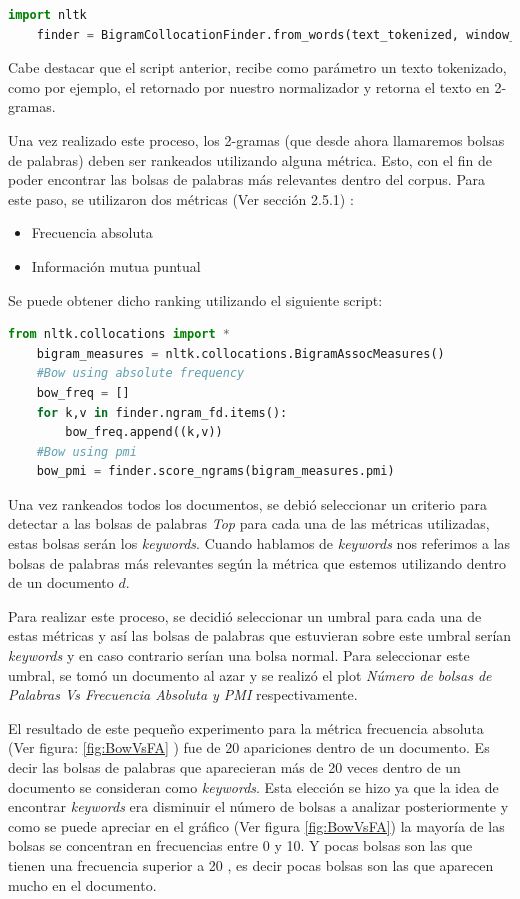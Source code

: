     \begin{lstlisting}[language=Python]
    import nltk
    finder = BigramCollocationFinder.from_words(text_tokenized, window_size = 3)
    \end{lstlisting}
    
    Cabe destacar que el script anterior, recibe como parámetro un texto tokenizado, como por ejemplo, el retornado por nuestro normalizador y retorna el texto en 2-gramas.
    
    Una vez realizado este proceso, los 2-gramas (que desde ahora llamaremos bolsas de palabras) deben ser rankeados utilizando alguna métrica. Esto, con el fin de poder encontrar las bolsas de palabras más relevantes dentro del corpus. Para este paso, se utilizaron dos métricas (Ver sección 2.5.1) :
    
    \begin{itemize}
        \item Frecuencia absoluta
        \item Información mutua puntual
    \end{itemize}
    
    Se puede obtener dicho ranking utilizando el siguiente script:
    \begin{lstlisting}[language=Python]
    from nltk.collocations import *
    bigram_measures = nltk.collocations.BigramAssocMeasures()
    #Bow using absolute frequency 
    bow_freq = []
    for k,v in finder.ngram_fd.items():
        bow_freq.append((k,v))
    #Bow using pmi
    bow_pmi = finder.score_ngrams(bigram_measures.pmi)
    \end{lstlisting}
    
     Una vez rankeados todos los documentos, se debió seleccionar un criterio para detectar a las bolsas de palabras \textit{Top} para cada una de las métricas utilizadas, estas bolsas serán los \textit{keywords}. Cuando hablamos de \textit{keywords} nos referimos a las bolsas de palabras más relevantes según la métrica que estemos utilizando dentro de un documento $d$. 
    
    Para realizar este proceso, se decidió seleccionar un umbral para cada una de estas métricas y así las bolsas de palabras que estuvieran sobre este umbral serían \textit{keywords} y en caso contrario serían una bolsa normal. Para seleccionar este umbral, se tomó un documento al azar y se realizó el plot \textit{Número de bolsas de Palabras Vs Frecuencia Absoluta y PMI} respectivamente.
    
    El resultado de este pequeño experimento para la métrica frecuencia absoluta (Ver figura: \ref{fig:BowVsFA} ) fue de 20 apariciones dentro de un documento. Es decir las bolsas de palabras que aparecieran más de 20 veces dentro de un documento se consideran como \textit{keywords}. Esta elección se hizo ya que la idea de encontrar \textit{keywords} era disminuir el número de bolsas a analizar posteriormente y como se puede apreciar en el gráfico (Ver figura \ref{fig:BowVsFA}) la mayoría de las bolsas se concentran en frecuencias entre 0 y 10. Y pocas bolsas son las que tienen una frecuencia superior a 20 , es decir pocas bolsas son las que aparecen mucho en el documento.
    
